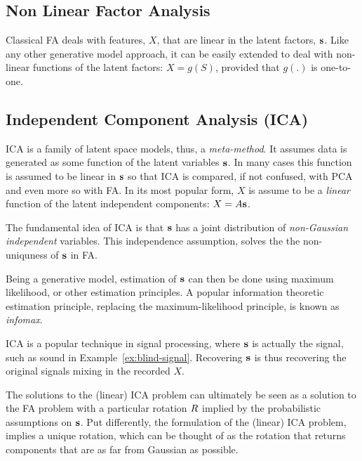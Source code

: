\documentclass[12pt,a4paper]{article}
\begin{document}
\subsection{Non Linear Factor Analysis}
Classical FA deals with features, $X$, that are linear in the latent factors, $\mathbf{s}$. 
Like any other generative model approach, it can be easily extended to deal with non-linear functions of the latent factors: $X=g(S)$, provided that $g(.)$ is one-to-one. 






\subsection{Independent Component Analysis (ICA)}
\label{sec:ica}


ICA is a family of latent space models, thus, a \emph{meta-method}.
It assumes data is generated as some function of the latent variables $\mathbf{s}$. 
In many cases this function is assumed to be linear in $\mathbf{s}$ so that ICA is compared, if not confused, with PCA and even more so with FA. 
In its most popular form, $X$ is assume to be a \emph{linear} function of the latent independent components: $X=A \mathbf{s}$.

The fundamental idea of ICA is that $\mathbf{s}$ has a joint distribution of \emph{non-Gaussian independent} variables. 
This independence assumption, solves the the non-uniquness of $\mathbf{s}$ in FA.

Being a generative model, estimation of $\mathbf{s}$ can then be done using maximum likelihood, or other estimation principles. 
A popular information theoretic estimation principle, replacing the maximum-likelihood principle, is known as \emph{infomax}.

ICA is a popular technique in signal processing, where $\mathbf{s}$ is actually the signal, such as sound in Example~\ref{ex:blind-signal}.
Recovering $\mathbf{s}$ is thus recovering the original signals mixing in the recorded $X$. 



\begin{remark}
	The solutions to the (linear) ICA problem can ultimately be seen as a solution to the FA problem with a particular rotation $R$ implied by the probabilistic assumptions on $\mathbf{s}$.
	Put differently, the formulation of the (linear) ICA problem, implies a unique rotation, which can be thought of as the rotation that returns components that are as far from Gaussian as possible. 
\end{remark}
\end{document}
